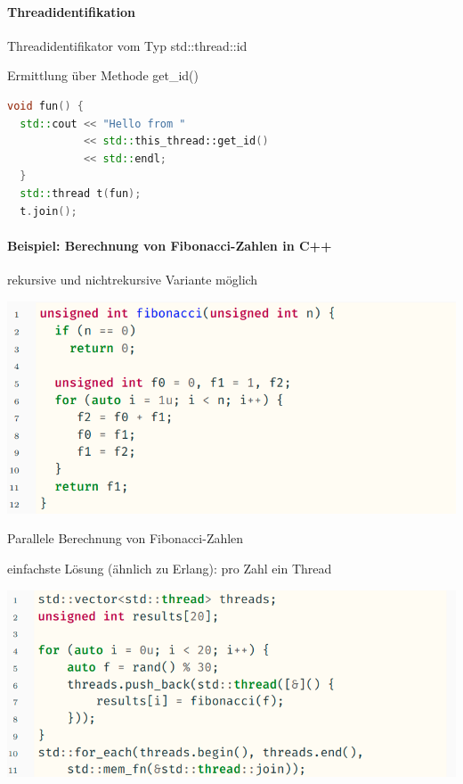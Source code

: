 \documentclass[10pt]{article}
\begin{document}
  \paragraph{Threadidentifikation}
  
  \begin{itemize*}
    \item Threadidentifikator vom Typ std::thread::id
    \item Ermittlung über Methode get\_id()
  \end{itemize*}
  \begin{lstlisting}[language=C++]
  void fun() {
  std::cout << "Hello from "
            << std::this_thread::get_id()
            << std::endl;
  }
  std::thread t(fun);
  t.join();
  \end{lstlisting}
  
  \paragraph{Beispiel: Berechnung von Fibonacci-Zahlen in C++}
  
  \begin{itemize*}
    \item rekursive und nichtrekursive Variante möglich
  \end{itemize*}
  \begin{center}
    \includegraphics[width=0.4\linewidth]{Assets/Programmierparadigmen-code-snippet-17}
  \end{center}
  
  Parallele Berechnung von Fibonacci-Zahlen
  \begin{itemize*}
    \item einfachste Lösung (ähnlich zu Erlang): pro Zahl ein Thread
  \end{itemize*}
  \begin{center}
    \includegraphics[width=0.4\linewidth]{Assets/Programmierparadigmen-code-snippet-18}
  \end{center}
  
\end{document}
